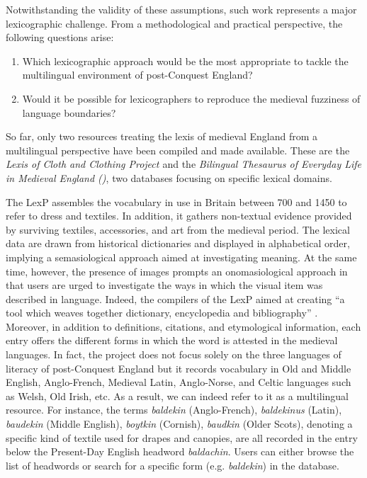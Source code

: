 \documentclass[output=paper,colorlinks,citecolor=brown,arabicfont,chinesefont]{langscibook}
\begin{document}
Notwithstanding the validity of these assumptions, such work represents a major lexicographic challenge. From a methodological and practical perspective, the following questions arise:

\begin{enumerate}
    \item Which lexicographic approach would be the most appropriate to tackle the multilingual environment of post-Conquest England?
    \item Would it be possible for lexicographers to reproduce the medieval fuzziness of language boundaries?
\end{enumerate}

So far, only two resources treating the lexis of medieval England from a multilingual perspective have been compiled and made available. These are the \emph{Lexis of Cloth and Clothing Project \citealt{[LexP]}} and the \emph{Bilingual Thesaurus of Everyday Life in Medieval England (\citealt{[BTh]})}, two databases focusing on specific lexical domains.

The LexP assembles the vocabulary in use in Britain between 700 and 1450 to refer to dress and textiles. In addition, it gathers non-textual evidence provided by surviving textiles, accessories, and art from the medieval period. The lexical data are drawn from historical dictionaries and displayed in alphabetical order, implying a semasiological approach aimed at investigating meaning. At the same time, however, the presence of images prompts an onomasiological approach in that users are urged to investigate the ways in which the visual item was described in language. Indeed, the compilers of the LexP aimed at creating “a tool which weaves together dictionary, encyclopedia and bibliography” \citep[772]{Rutten2008}. Moreover, in addition to definitions, citations, and etymological information, each entry offers the different forms in which the word is attested in the medieval languages. In fact, the project does not focus solely on the three languages of literacy of post-Conquest England but it records vocabulary in Old and Middle English, Anglo-French, Medieval Latin, Anglo-Norse, and Celtic languages such as Welsh, Old Irish, etc. As a result, we can indeed refer to it as a multilingual resource. For instance, the terms \emph{baldekin} (Anglo-French), \emph{baldekinus} (Latin), \emph{baudekin} (Middle English), \emph{boytkin} (Cornish), \emph{baudkin} (Older Scots), denoting a specific kind of textile used for drapes and canopies, are all recorded in the entry below the Present-Day English headword \emph{baldachin}. Users can either browse the list of headwords or search for a specific form (e.g. \emph{baldekin}) in the database.
\end{document}
